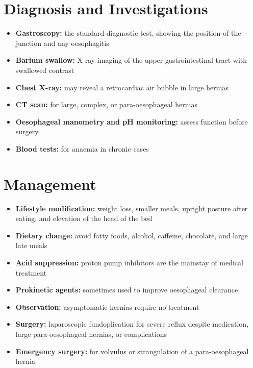 \section*{Diagnosis and Investigations}
\begin{itemize}
    \item \textbf{Gastroscopy:} the standard diagnostic test, showing the position of the junction and any oesophagitis
    \item \textbf{Barium swallow:} X-ray imaging of the upper gastrointestinal tract with swallowed contrast
    \item \textbf{Chest X-ray:} may reveal a retrocardiac air bubble in large hernias
    \item \textbf{CT scan:} for large, complex, or para-oesophageal hernias
    \item \textbf{Oesophageal manometry and pH monitoring:} assess function before surgery
    \item \textbf{Blood tests:} for anaemia in chronic cases
\end{itemize}

\section*{Management}
\begin{itemize}
    \item \textbf{Lifestyle modification:} weight loss, smaller meals, upright posture after eating, and elevation of the head of the bed
    \item \textbf{Dietary change:} avoid fatty foods, alcohol, caffeine, chocolate, and large late meals
    \item \textbf{Acid suppression:} proton pump inhibitors are the mainstay of medical treatment
    \item \textbf{Prokinetic agents:} sometimes used to improve oesophageal clearance
    \item \textbf{Observation:} asymptomatic hernias require no treatment
    \item \textbf{Surgery:} laparoscopic fundoplication for severe reflux despite medication, large para-oesophageal hernias, or complications
    \item \textbf{Emergency surgery:} for volvulus or strangulation of a para-oesophageal hernia
\end{itemize}

